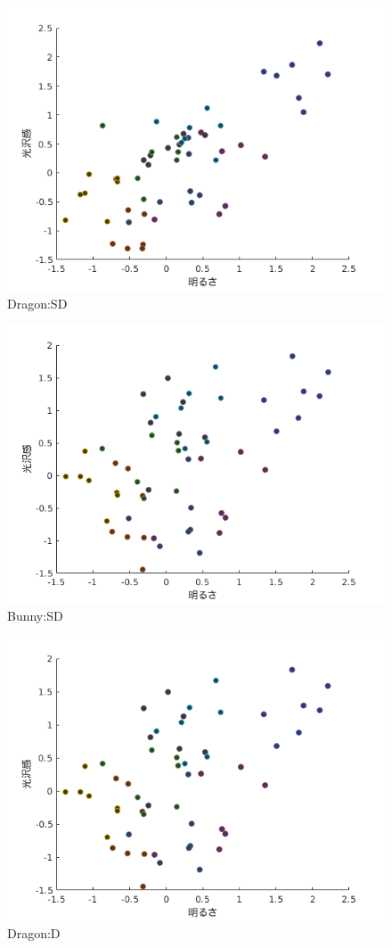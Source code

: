     \begin{figure}[h]
        \centering
        \includegraphics[width=12.0cm]{./img/ex3_DSD.png}
        \caption{Dragon:SD}
        \label{ex3_DSD}
    \end{figure}

    \begin{figure}[h]
        \centering
        \includegraphics[width=12.0cm]{./img/ex3_BSD.png}
        \caption{Bunny:SD}
        \label{ex3_DSD}
    \end{figure}

    \begin{figure}[h]
        \centering
        \includegraphics[width=12.0cm]{./img/ex3_DD.png}
        \caption{Dragon:D}
        \label{ex3_DD}
    \end{figure}

